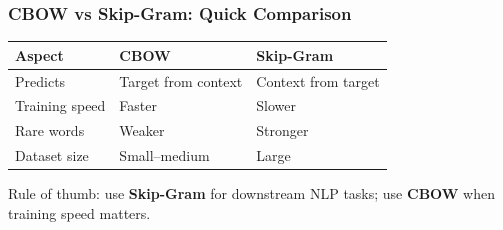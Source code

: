 

\begin{frame}[fragile]\frametitle{CBOW vs Skip-Gram: Quick Comparison}
\begin{center}
\begin{tabular}{lll}
\hline
\textbf{Aspect} & \textbf{CBOW} & \textbf{Skip-Gram} \\
\hline
Predicts & Target from context & Context from target \\
Training speed & Faster & Slower \\
Rare words & Weaker & Stronger \\
Dataset size & Small--medium & Large \\
\hline
\end{tabular}
\end{center}
\vspace{0.3em}
{\small Rule of thumb: use \textbf{Skip-Gram} for downstream NLP tasks; use \textbf{CBOW} when training speed matters.}
\end{frame}



